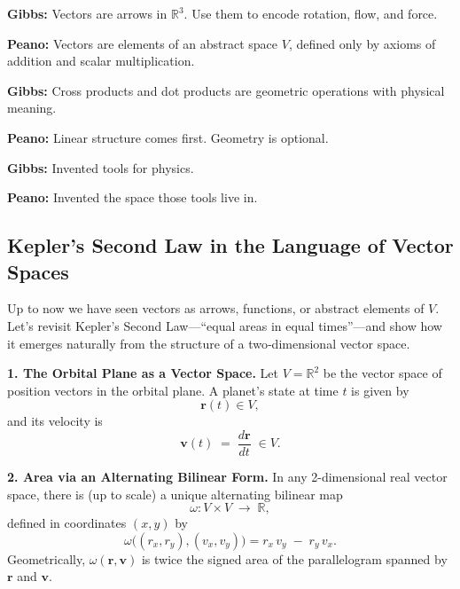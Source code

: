 \begin{tcolorbox}[colback=gray!5!white, colframe=black, title=\textbf{Sidebar: Gibbs vs. Peano — Action vs. Abstraction}, fonttitle=\bfseries, arc=1.5mm, boxrule=0.4pt]

\textbf{Gibbs:}  
Vectors are arrows in \( \mathbb{R}^3 \). Use them to encode rotation, flow, and force.

\textbf{Peano:}  
Vectors are elements of an abstract space \( V \), defined only by axioms of addition and scalar multiplication.

\medskip

\textbf{Gibbs:}  
Cross products and dot products are geometric operations with physical meaning.

\textbf{Peano:}  
Linear structure comes first. Geometry is optional.

\medskip

\textbf{Gibbs:}  
Invented tools for physics.

\textbf{Peano:}  
Invented the space those tools live in.
\end{tcolorbox}











\subsection{Kepler’s Second Law in the Language of Vector Spaces}

Up to now we have seen vectors as arrows, functions, or abstract elements of \(V\).  Let’s revisit Kepler’s Second Law—“equal areas in equal times”—and show how it emerges naturally from the structure of a two‐dimensional vector space.

\medskip
\noindent\textbf{1. The Orbital Plane as a Vector Space.}  
Let \(V=\mathbb R^2\) be the vector space of position vectors in the orbital plane.  A planet’s state at time \(t\) is given by  
\[
\mathbf r(t)\in V,
\]
and its velocity is  
\[
\mathbf v(t) \;=\;\frac{d\mathbf r}{dt}\;\in V.
\]

\medskip
\noindent\textbf{2. Area via an Alternating Bilinear Form.}  
In any 2-dimensional real vector space, there is (up to scale) a unique alternating bilinear map
\[
\omega:V\times V\;\longrightarrow\;\mathbb R,
\]
defined in coordinates \((x,y)\) by
\[
\omega\bigl((r_x,r_y),(v_x,v_y)\bigr)
= r_x\,v_y \;-\; r_y\,v_x.
\]
Geometrically, \(\omega(\mathbf r,\mathbf v)\) is twice the signed area of the parallelogram spanned by \(\mathbf r\) and \(\mathbf v\).

